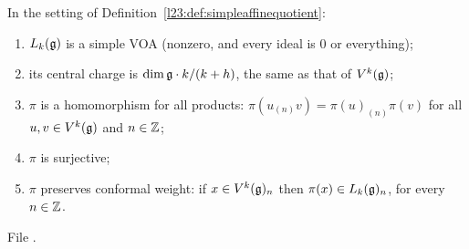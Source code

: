 \begin{theorem}\label{l23:thm:simpleaffinequotient}
In the setting of Definition~\ref{l23:def:simpleaffinequotient}:
\begin{enumerate}
\item $L_k(\mathfrak g)$ is a simple VOA (nonzero, and every ideal is $0$ or everything);
\item its central charge is $\dim\mathfrak g\cdot k/(k+h)$, the same as that of $V^k(\mathfrak g)$;
\item $\pi$ is a homomorphism for all products: $\pi(u_{(n)}v)=\pi(u)_{(n)}\pi(v)$ for all $u,v\in V^k(\mathfrak g)$ and $n\in{\mathbb{Z}}$;
\item $\pi$ is surjective;
\item $\pi$ preserves conformal weight: if $x\in V^k(\mathfrak g)_n$ then $\pi(x)\in L_k(\mathfrak g)_n$, for every $n\in{\mathbb{Z}}$.
\end{enumerate}
\end{theorem}
\noindent File .
